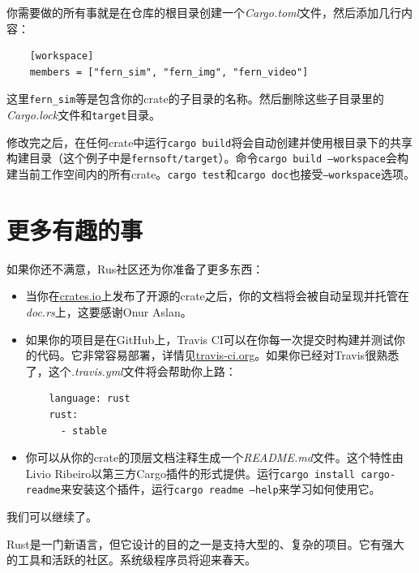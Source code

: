 你需要做的所有事就是在仓库的根目录创建一个\emph{Cargo.toml}文件，然后添加几行内容：
\begin{verbatim}
    [workspace]
    members = ["fern_sim", "fern_img", "fern_video"]
\end{verbatim}
这里\texttt{fern\_sim}等是包含你的crate的子目录的名称。然后删除这些子目录里的\emph{Cargo.lock}文件和\texttt{target}目录。

修改完之后，在任何crate中运行\texttt{cargo build}将会自动创建并使用根目录下的共享构建目录（这个例子中是\texttt{fernsoft/target}）。命令\texttt{cargo build --workspace}会构建当前工作空间内的所有crate。\texttt{cargo test}和\texttt{cargo doc}也接受\texttt{--workspace}选项。

\section{更多有趣的事}

如果你还不满意，Rus社区还为你准备了更多东西：
\begin{itemize}
    \item 当你在\href{https://crates.io}{crates.io}上发布了开源的crate之后，你的文档将会被自动呈现并托管在\emph{doc.rs}上，这要感谢Onur Aslan。
    \item 如果你的项目是在GitHub上，Travis CI可以在你每一次提交时构建并测试你的代码。它非常容易部署，详情见\href{https://travis-ci.org}{travis-ci.org}。如果你已经对Travis很熟悉了，这个\emph{.travis.yml}文件将会帮助你上路：
    \begin{verbatim}
    language: rust
    rust:
      - stable
    \end{verbatim}
    \item 你可以从你的crate的顶层文档注释生成一个\emph{README.md}文件。这个特性由Livio Ribeiro以第三方Cargo插件的形式提供。运行\texttt{cargo install cargo-readme}来安装这个插件，运行\texttt{cargo readme --help}来学习如何使用它。
\end{itemize}

我们可以继续了。

Rust是一门新语言，但它设计的目的之一是支持大型的、复杂的项目。它有强大的工具和活跃的社区。系统级程序员将迎来春天。
